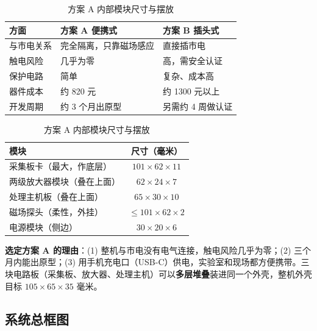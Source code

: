 \documentclass[a4paper,11pt,oneside,UTF8,scheme=plain]{ctexart}
\begin{document}
\begin{table}[H]
\begin{minipage}[t]{0.49\textwidth}
\centering
\caption{方案 A 与方案 B 形态对比}
\label{tab:routea-vs-b}
\footnotesize
\begin{tabularx}{\textwidth}{l>{\raggedright\arraybackslash}X>{\raggedright\arraybackslash}X}
\toprule
\rowcolor{tableheader}
\textbf{方面} & \textbf{方案 A 便携式} & \textbf{方案 B 插头式} \\
\midrule
与市电关系 & 完全隔离，只靠磁场感应 & 直接插市电 \\
触电风险 & 几乎为零 & 高，需安全认证 \\
保护电路 & 简单 & 复杂、成本高 \\
器件成本 & 约 820 元 & 约 1300 元以上 \\
开发周期 & 约 3 个月出原型 & 另需约 4 周做认证 \\
\bottomrule
\end{tabularx}
\end{minipage}
\hfill
\begin{minipage}[t]{0.49\textwidth}
\centering
\caption{方案 A 内部模块尺寸与摆放}
\label{tab:dim-budget}
\footnotesize
\begin{tabularx}{\textwidth}{>{\raggedright\arraybackslash}Xc}
\toprule
\rowcolor{tableheader}
\textbf{模块} & \textbf{尺寸（毫米）} \\
\midrule
采集板卡（最大，作底层） & \(101 \times 62 \times 11\) \\
两级放大器模块（叠在上面） & \(62 \times 24 \times 7\) \\
处理主机板（叠在上面） & \(65 \times 30 \times 10\) \\
磁场探头（柔性，外挂） & \(\le 101 \times 62 \times 2\) \\
电源模块（侧边） & \(30 \times 20 \times 6\) \\
\bottomrule
\end{tabularx}
\end{minipage}
\end{table}

\textbf{选定方案 A 的理由}：(1) 整机与市电没有电气连接，触电风险几乎为零；(2) 三个月内能出原型；(3) 用手机充电口（USB-C）供电，实验室和现场都方便携带。三块电路板（采集板、放大器、处理主机）可以\textbf{多层堆叠}装进同一个外壳，整机外壳目标 \(105 \times 65 \times 35\) 毫米。

\subsection{系统总框图}
\label{sec:block-diagram}
\end{document}

